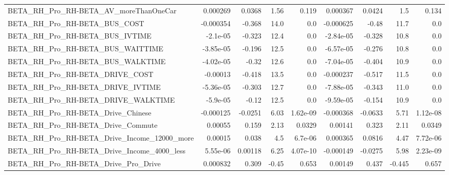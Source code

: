 \begin{tabular}{lrrrrrrrr}
BETA\_RH\_Pro\_RH-BETA\_AV\_moreThanOneCar              &    0.000269 &       0.0368 &      1.56 &    0.119 &   0.000367 &      0.0424 &          1.5 &         0.134 \\
BETA\_RH\_Pro\_RH-BETA\_BUS\_COST                       &   -0.000354 &       -0.368 &      14.0 &      0.0 &  -0.000625 &       -0.48 &         11.7 &           0.0 \\
BETA\_RH\_Pro\_RH-BETA\_BUS\_IVTIME                     &    -2.1e-05 &       -0.323 &      12.4 &      0.0 &  -2.84e-05 &      -0.328 &         10.8 &           0.0 \\
BETA\_RH\_Pro\_RH-BETA\_BUS\_WAITTIME                   &   -3.85e-05 &       -0.196 &      12.5 &      0.0 &  -6.57e-05 &      -0.276 &         10.8 &           0.0 \\
BETA\_RH\_Pro\_RH-BETA\_BUS\_WALKTIME                   &   -4.02e-05 &        -0.32 &      12.6 &      0.0 &  -7.04e-05 &      -0.404 &         10.9 &           0.0 \\
BETA\_RH\_Pro\_RH-BETA\_DRIVE\_COST                     &    -0.00013 &       -0.418 &      13.5 &      0.0 &  -0.000237 &      -0.517 &         11.5 &           0.0 \\
BETA\_RH\_Pro\_RH-BETA\_DRIVE\_IVTIME                   &   -5.36e-05 &       -0.303 &      12.7 &      0.0 &  -7.88e-05 &      -0.343 &         11.0 &           0.0 \\
BETA\_RH\_Pro\_RH-BETA\_DRIVE\_WALKTIME                 &    -5.9e-05 &        -0.12 &      12.5 &      0.0 &  -9.59e-05 &      -0.154 &         10.9 &           0.0 \\
BETA\_RH\_Pro\_RH-BETA\_Drive\_Chinese                  &   -0.000125 &      -0.0251 &      6.03 & 1.62e-09 &  -0.000368 &     -0.0633 &         5.71 &      1.12e-08 \\
BETA\_RH\_Pro\_RH-BETA\_Drive\_Commute                  &     0.00055 &        0.159 &      2.13 &   0.0329 &    0.00141 &       0.323 &         2.11 &        0.0349 \\
BETA\_RH\_Pro\_RH-BETA\_Drive\_Income\_12000\_more        &     0.00015 &        0.038 &       4.5 &  6.7e-06 &   0.000365 &      0.0816 &         4.47 &      7.72e-06 \\
BETA\_RH\_Pro\_RH-BETA\_Drive\_Income\_4000\_less         &    5.55e-06 &      0.00118 &      6.25 & 4.07e-10 &  -0.000149 &     -0.0275 &         5.98 &      2.23e-09 \\
BETA\_RH\_Pro\_RH-BETA\_Drive\_Pro\_Drive                &    0.000832 &        0.309 &     -0.45 &    0.653 &    0.00149 &       0.437 &       -0.445 &         0.657 \\

\end{tabular}
